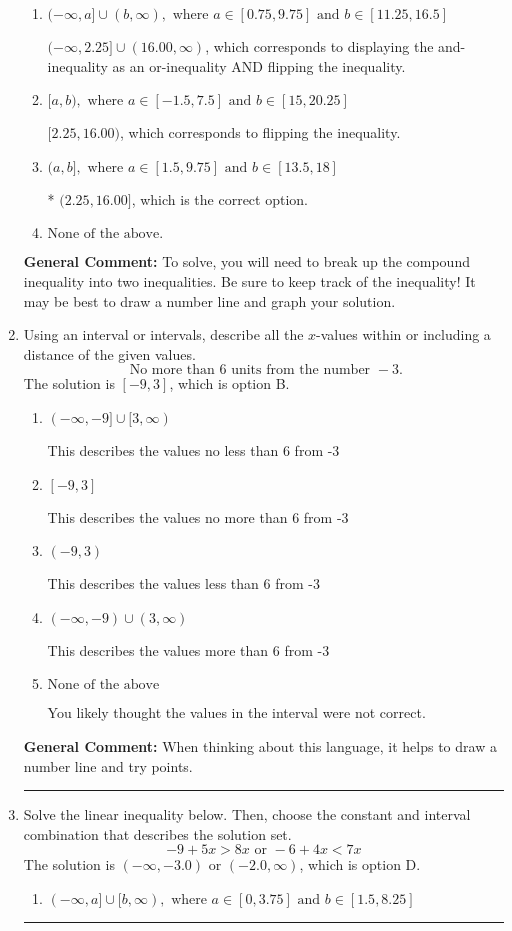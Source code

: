 \documentclass{extbook}[14pt]
\newcommand{\litem}[1]{\item #1

\rule{\textwidth}{0.4pt}}
\begin{document}
\begin{enumerate}
{\begin{enumerate}[label=\Alph*.]
$(-\infty, 2.25) \cup [16.00, \infty)$, which corresponds to displaying the and-inequality as an or-inequality.
\item \( (-\infty, a] \cup (b, \infty), \text{ where } a \in [0.75, 9.75] \text{ and } b \in [11.25, 16.5] \)

$(-\infty, 2.25] \cup (16.00, \infty)$, which corresponds to displaying the and-inequality as an or-inequality AND flipping the inequality.
\item \( [a, b), \text{ where } a \in [-1.5, 7.5] \text{ and } b \in [15, 20.25] \)

$[2.25, 16.00)$, which corresponds to flipping the inequality.
\item \( (a, b], \text{ where } a \in [1.5, 9.75] \text{ and } b \in [13.5, 18] \)

* $(2.25, 16.00]$, which is the correct option.
\item \( \text{None of the above.} \)


\end{enumerate}

\textbf{General Comment:} To solve, you will need to break up the compound inequality into two inequalities. Be sure to keep track of the inequality! It may be best to draw a number line and graph your solution.
}
\litem{
Using an interval or intervals, describe all the $x$-values within or including a distance of the given values.
\[ \text{ No more than } 6 \text{ units from the number } -3. \]The solution is \( [-9, 3] \), which is option B.\begin{enumerate}[label=\Alph*.]
\item \( (-\infty, -9] \cup [3, \infty) \)

This describes the values no less than 6 from -3
\item \( [-9, 3] \)

This describes the values no more than 6 from -3
\item \( (-9, 3) \)

This describes the values less than 6 from -3
\item \( (-\infty, -9) \cup (3, \infty) \)

This describes the values more than 6 from -3
\item \( \text{None of the above} \)

You likely thought the values in the interval were not correct.
\end{enumerate}

\textbf{General Comment:} When thinking about this language, it helps to draw a number line and try points.
}
\litem{
Solve the linear inequality below. Then, choose the constant and interval combination that describes the solution set.
\[ -9 + 5 x > 8 x \text{ or } -6 + 4 x < 7 x \]The solution is \( (-\infty, -3.0) \text{ or } (-2.0, \infty) \), which is option D.\begin{enumerate}[label=\Alph*.]
\item \( (-\infty, a] \cup [b, \infty), \text{ where } a \in [0, 3.75] \text{ and } b \in [1.5, 8.25] \)


\end{enumerate}}
\end{enumerate}
\end{document}
